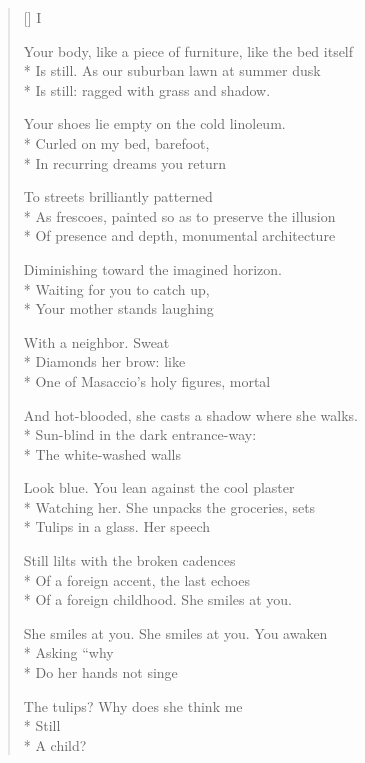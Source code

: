 \label{ch:a_shadowed_poem}
\settowidth{\versewidth}{Your body, like a piece of furniture, like the bed itself}
\begin{verse}[\versewidth]
\hspace{0.45\versewidth}I

Your body, like a piece of furniture, like the bed itself\\*
Is still. As our suburban lawn at summer dusk\\*
Is still: ragged with grass and shadow.

Your shoes lie empty on the cold linoleum.\\*
Curled on my bed, barefoot,\\*
In recurring dreams you return

To streets brilliantly patterned\\*
As frescoes, painted so as to preserve the illusion\\*
Of presence and depth, monumental architecture

Diminishing toward the imagined horizon.\\*
Waiting for you to catch up,\\*
Your mother stands laughing

With a neighbor.  Sweat\\*
Diamonds her brow: like\\*
One of Masaccio's holy figures, mortal

And hot-blooded, she casts a shadow where she walks.\\*
Sun-blind in the dark entrance-way:\\*
The white-washed walls

Look blue.  You lean against the cool plaster\\*
Watching her.  She unpacks the groceries, sets\\*
Tulips in a glass.  Her speech

Still lilts with the broken cadences\\*
Of a foreign accent, the last echoes\\*
Of a foreign childhood.  She smiles at you.

She smiles at you. She smiles at you. You awaken\\*
Asking ``why\\*
Do her hands not singe

The tulips? Why does she think me\\*
Still\\*
A child?


\end{verse}
